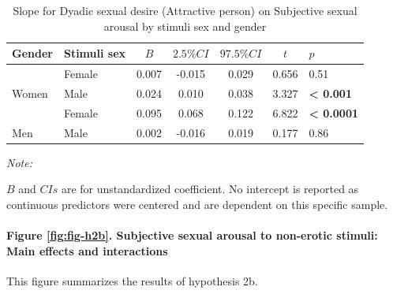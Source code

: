 \documentclass[
  bookmarksnumbered]{article}
\begin{document}
\begin{table}[H]

\caption{\label{tab:tab-m2b-slo-e}Slope for Dyadic sexual desire (Attractive person) on 
        Subjective sexual arousal by stimuli sex and gender}
\centering
\begin{threeparttable}
\begin{tabular}[t]{llccccl}
\toprule
Gender & Stimuli sex & $B$ & $2.5\% CI$ & $97.5\% CI$ & $t$ & $p$\\
\midrule
 & Female & 0.007 & -0.015 & 0.029 & 0.656 & 0.51\\
\cmidrule{2-7}
\multirow{-2}{*}{\raggedright\arraybackslash Women} & Male & 0.024 & 0.010 & 0.038 & 3.327 & \textbf{< 0.001}\\
\cmidrule{1-7}
 & Female & 0.095 & 0.068 & 0.122 & 6.822 & \textbf{< 0.0001}\\
\cmidrule{2-7}
\multirow{-2}{*}{\raggedright\arraybackslash Men} & Male & 0.002 & -0.016 & 0.019 & 0.177 & 0.86\\
\bottomrule
\end{tabular}
\begin{tablenotes}[para]
\item \textit{Note: } 
\item $B$ and $CIs$ are for unstandardized coefficient.
           No intercept is reported as continuous predictors were centered
           and are dependent on this specific sample.
\end{tablenotes}
\end{threeparttable}
\end{table}

\hypertarget{figure-reffigfig-h2b.-subjective-sexual-arousal-to-non-erotic-stimuli-main-effects-and-interactions}{%
\paragraph{Figure \ref{fig:fig-h2b}. Subjective sexual arousal to non-erotic stimuli: Main effects and interactions}\label{figure-reffigfig-h2b.-subjective-sexual-arousal-to-non-erotic-stimuli-main-effects-and-interactions}}

This figure summarizes the results of hypothesis 2b.
\end{document}
